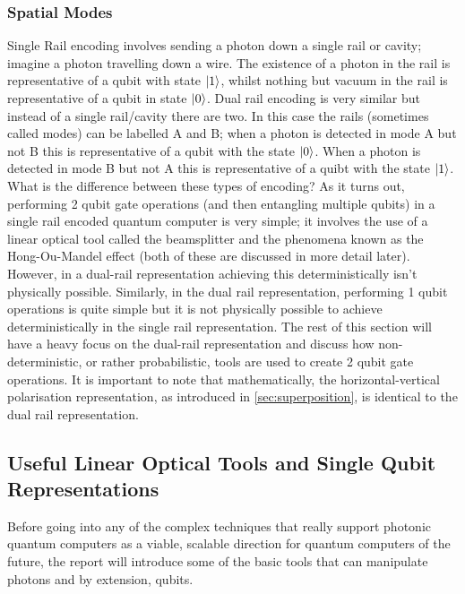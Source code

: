 \subsubsection{Spatial Modes}
Single Rail encoding involves sending a photon down a single rail or cavity; imagine a photon travelling down a wire. The existence of a photon in the rail is representative of a qubit with state $\ket{1}$, whilst nothing but vacuum in the rail is representative of a qubit in state $\ket{0}$. Dual rail encoding is very similar but instead of a single rail/cavity there are two. In this case the rails (sometimes called modes) can be labelled A and B; when a photon is detected in mode A but not B this is representative of a qubit with the state $\ket{0}$. When a photon is detected in mode B but not A this is representative of a quibt with the state $\ket{1}$. \\ What is the difference between these types of encoding? As it turns out, performing 2 qubit gate operations (and then entangling multiple qubits) in a single rail encoded quantum computer is very simple; it involves the use of a linear optical tool called the beamsplitter and the phenomena known as the Hong-Ou-Mandel effect (both of these are discussed in more detail later). However, in a dual-rail representation achieving this deterministically isn't physically possible. Similarly, in the dual rail representation, performing 1 qubit operations is quite simple but it is not physically possible to achieve deterministically in the single rail representation. The rest of this section will have a heavy focus on the dual-rail representation and discuss how non-deterministic, or rather probabilistic, tools are used to create 2 qubit gate operations. It is important to note that mathematically, the horizontal-vertical polarisation representation, as introduced in \cref{sec:superposition}, is identical to the dual rail representation. 



\subsection{Useful Linear Optical Tools and Single Qubit Representations}
Before going into any of the complex techniques that really support photonic quantum computers as a viable, scalable direction for quantum computers of the future, the report will introduce some of the basic tools that can manipulate photons and by extension, qubits.
